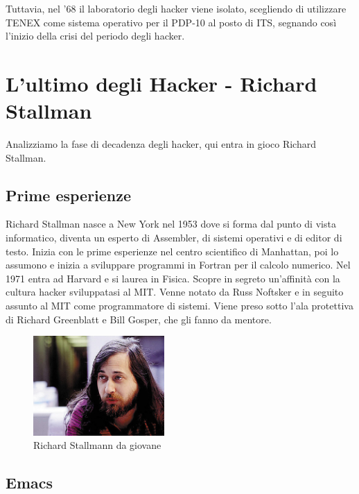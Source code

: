 Tuttavia, nel '68 il laboratorio degli hacker viene isolato, scegliendo di utilizzare TENEX come sistema operativo per il PDP-10 al posto di ITS, segnando così l'inizio della crisi del periodo degli hacker.

\section{L'ultimo degli Hacker - Richard Stallman}

Analizziamo la fase di decadenza degli hacker, qui entra in gioco Richard Stallman.

\subsection{Prime esperienze}

Richard Stallman nasce a New York nel 1953 dove si forma dal punto di vista informatico, diventa un esperto di Assembler, di sistemi operativi e di editor di testo. Inizia con le prime esperienze nel centro scientifico di Manhattan, poi lo assumono e inizia a sviluppare programmi in Fortran per il calcolo numerico. Nel 1971 entra ad Harvard e si laurea in Fisica. Scopre in segreto un'affinità con la cultura hacker sviluppatasi al MIT. Venne notato da Russ Noftsker e in seguito assunto al MIT come programmatore di sistemi. Viene preso sotto l'ala protettiva di Richard Greenblatt e Bill Gosper, che gli fanno da mentore.

\begin{figure}[htbp]
	\centering
	\includegraphics[width=50mm]{images/stallman.jpg}
	\caption{Richard Stallmann da giovane}
\end{figure}

\subsection{Emacs}

